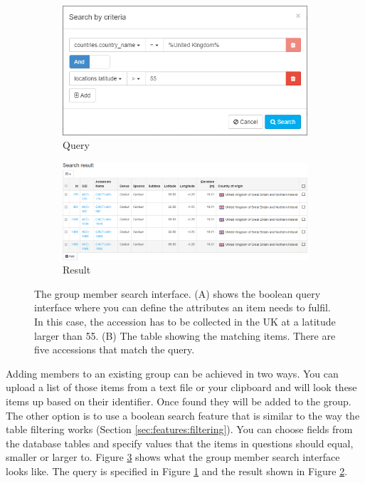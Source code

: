\begin{figure}
	\centering
	\begin{subfigure}[b]{0.3\linewidth}
		\includegraphics[width=1\linewidth]{img/features/groups-search-query.png}
		\caption{Query}
		\label{fig:features:groups-search-query}
	\end{subfigure}
	\begin{subfigure}[b]{0.68\linewidth}
		\includegraphics[width=1\linewidth]{img/features/groups-search-result.png}
		\caption{Result}
		\label{fig:features:groups-search-result}
	\end{subfigure}
	\caption{The group member search interface. (A) shows the boolean query interface where you can define the attributes an item needs to fulfil. In this case, the accession has to be collected in the UK at a latitude larger than 55. (B) The table showing the matching items. There are five accessions that match the query.}
	\label{fig:features:groups-search}
\end{figure}

Adding members to an existing group can be achieved in two ways. You can upload a list of those items from a text file or your clipboard and {\germinate} will look these items up based on their identifier. Once found they will be added to the group. The other option is to use a boolean search feature that is similar to the way the table filtering works (\cf Section \ref{sec:features:filtering}). You can choose fields from the database tables and specify values that the items in questions should equal, smaller or larger to. Figure \ref{fig:features:groups-search} shows what the group member search interface looks like. The query is specified in Figure \ref{fig:features:groups-search-query} and the result shown in Figure \ref{fig:features:groups-search-result}.

